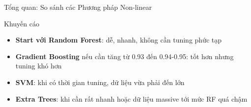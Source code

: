 \begin{frame}{Tổng quan: So sánh các Phương pháp Non-linear}
    \vspace{0.2cm}
    \begin{alertblock}{Khuyến cáo}
        \begin{itemize}
            \item \textbf{Start với Random Forest}: dễ, nhanh, không cần tuning phức tạp
            \item \textbf{Gradient Boosting} nếu cần tăng từ 0.93 đến 0.94-0.95: tốt hơn nhưng tuning khó hơn
            \item \textbf{SVM}: khi có thời gian tuning, dữ liệu vừa phải đến lớn
            \item \textbf{Extra Trees}: khi cần rất nhanh hoặc dữ liệu massive tới mức RF quá chậm
        \end{itemize}
    \end{alertblock}

    \hfill{\scriptsize \cite{duchesnay2021statsml}}
\end{frame}



